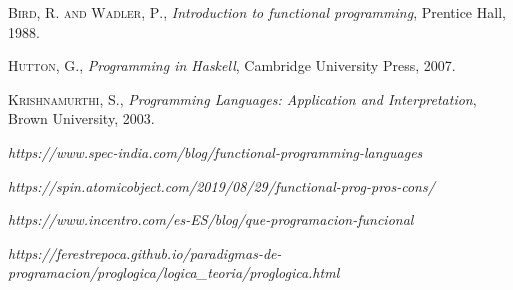 \documentclass{article}
\begin{document}
\newpage

\begin{thebibliography}{10}

 \textsc{Bird, R. and Wadler, P}., \textit{Introduction to functional programming}, Prentice Hall, 1988.

 \textsc{Hutton, G.}, \textit{Programming in Haskell}, Cambridge University Press, 2007.

 \textsc{Krishnamurthi, S.}, \textit{Programming Languages: Application and Interpretation}, Brown University, 2003.

 \textit{https://www.spec-india.com/blog/functional-programming-languages}

 \textit{https://spin.atomicobject.com/2019/08/29/functional-prog-pros-cons/}

 \textit{https://www.incentro.com/es-ES/blog/que-programacion-funcional}

 \textit{https://ferestrepoca.github.io/paradigmas-de-programacion/proglogica/logica\_teoria/proglogica.html}

\end{thebibliography}
\end{document}
